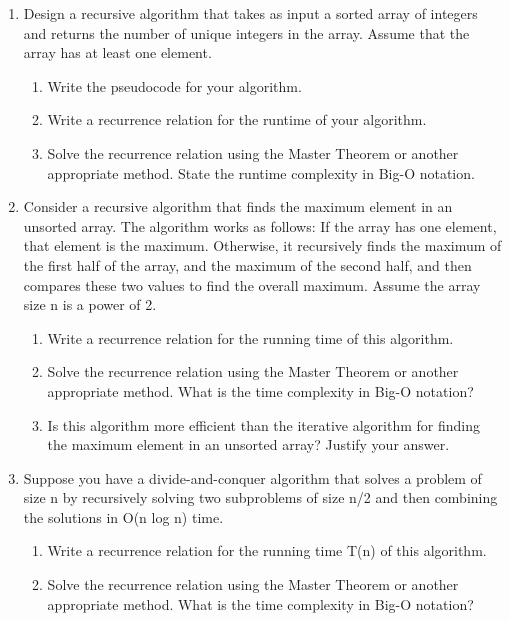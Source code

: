 \documentclass{article}
\begin{document}
\begin{enumerate}
    \item  Design a recursive algorithm that takes as input a sorted array of integers and returns the number of unique integers in the array.  Assume that the array has at least one element.
    \begin{enumerate}
        \item Write the pseudocode for your algorithm.
        \item Write a recurrence relation for the runtime of your algorithm.
        \item Solve the recurrence relation using the Master Theorem or another appropriate method.  State the runtime complexity in Big-O notation.
    \end{enumerate}

    \item Consider a recursive algorithm that finds the maximum element in an unsorted array. The algorithm works as follows: If the array has one element, that element is the maximum. Otherwise, it recursively finds the maximum of the first half of the array, and the maximum of the second half, and then compares these two values to find the overall maximum. Assume the array size n is a power of 2.
    \begin{enumerate}
        \item Write a recurrence relation for the running time of this algorithm.
        \item Solve the recurrence relation using the Master Theorem or another appropriate method.  What is the time complexity in Big-O notation?
        \item Is this algorithm more efficient than the iterative algorithm for finding the maximum element in an unsorted array? Justify your answer.
    \end{enumerate}

    \item  Suppose you have a divide-and-conquer algorithm that solves a problem of size n by recursively solving two subproblems of size n/2 and then combining the solutions in O(n log n) time.
    \begin{enumerate}
        \item Write a recurrence relation for the running time T(n) of this algorithm.
        \item Solve the recurrence relation using the Master Theorem or another appropriate method. What is the time complexity in Big-O notation?
    \end{enumerate}


\end{enumerate}
\end{document}
